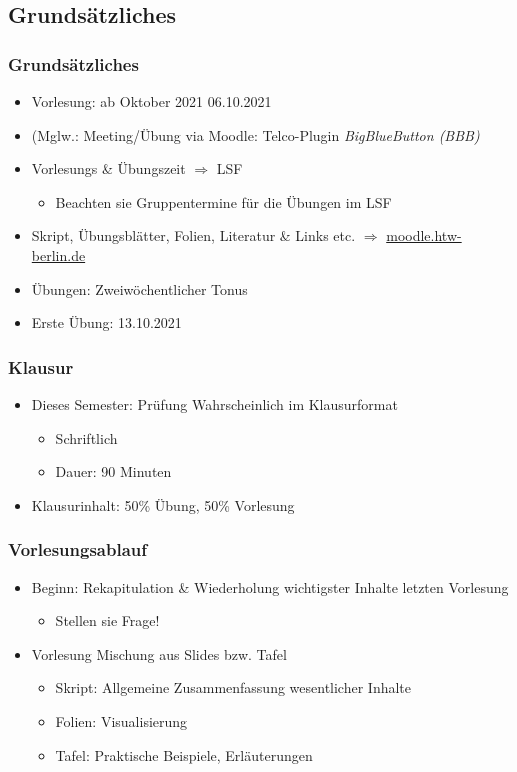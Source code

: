 \documentclass[xcolor=dvipsnames,aspectratio=169]{beamer}
\begin{document}
\subsection{Grundsätzliches}
\begin{frame}
	\frametitle{Grundsätzliches}
	\begin{itemize}
		\item Vorlesung: ab Oktober 2021 06.10.2021
		\item (Mglw.: Meeting/Übung via Moodle: Telco-Plugin \emph{BigBlueButton (BBB)}
		\item Vorlesungs \& Übungszeit $\Rightarrow$ LSF
		\begin{itemize}
			\item Beachten sie Gruppentermine für die Übungen im LSF
		\end{itemize}
		\item Skript, Übungsblätter, Folien, Literatur \& Links etc. $\Rightarrow$ \url{moodle.htw-berlin.de}
		\item Übungen: Zweiwöchentlicher Tonus 
		\item Erste Übung: 13.10.2021
	\end{itemize}
\end{frame}

\begin{frame}
	\frametitle{Klausur}
		\begin{itemize}
			\item Dieses Semester: Prüfung Wahrscheinlich im Klausurformat	
			\begin{itemize}
				\item Schriftlich
				\item Dauer: 90 Minuten
			\end{itemize}
			\item Klausurinhalt: 50\% Übung, 50\% Vorlesung
		\end{itemize}
\end{frame}

\begin{frame}
	\frametitle{Vorlesungsablauf}
	\begin{itemize}
		\item Beginn: Re­ka­pi­tu­la­ti­on \& Wiederholung wichtigster Inhalte letzten Vorlesung
		\begin{itemize}
			\item Stellen sie Frage!
		\end{itemize}
		\item Vorlesung Mischung aus Slides bzw. Tafel
		\begin{itemize}
			\item Skript: Allgemeine Zusammenfassung wesentlicher Inhalte
			\item Folien: Visualisierung
			\item Tafel: Praktische Beispiele, Erläuterungen
		\end{itemize}
	\end{itemize}
\end{frame}
\end{document}
